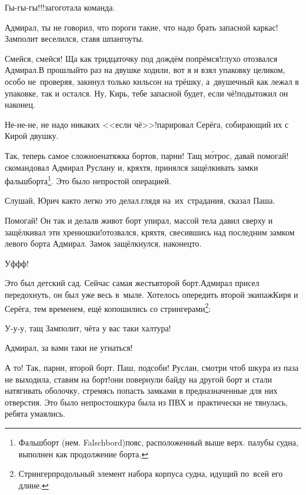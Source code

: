 \diagdash Гы-гы-гы!!!\mdash загоготала команда.

\diagdash Адмирал, ты не говорил, что пороги такие, что надо брать запасной каркас!\mdash Замполит веселился, ставя шпангоуты.

\diagdash Смейся, смейся! Ща как тридцаточку под дождём попрёмся!\mdash глухо отозвался Адмирал.\mdash В прошлый\sdash то раз на двушке ходили, вот я и взял упаковку целиком, особо не~проверяя, закинул только кильсон на трёшку, а~двушечный как лежал в упаковке, так и остался. Ну, Кирь, тебе запасной будет, если чё!\mdash подытожил он наконец.

\diagdash Не-не-не, не надо никаких <<если чё>>!\mdash парировал Серёга, собирающий их с Кирой двушку.

\diagdash Так, теперь самое сложное\mdash натяжка бортов, парни! Тащ м\'{о}трос, давай помогай!\mdash скомандовал Адмирал Руслану и, кряхтя, принялся защёлкивать замки фальшборта\footnote{Фальшборт (нем. Falschbord)\mdash пояс, расположенный выше верх. палубы судна, выполнен как продолжение борта\cite{МорскойСправочник}.}. Это было непростой операцией.

\diagdash Слушай, Юрич как\sdash то легко это делал.\mdash глядя на~их~страдания, сказал Паша.

\diagdash Помогай! Он так и делал\mdash в живот борт упирал, массой тела давил сверху и защёлкивал эти хренюшки!\mdash отозвался, кряхтя, свесившись над последним замком левого борта Адмирал. Замок защёлкнулся, наконец\sdash то.

\diagdash Уф\sdash ф\sdash ф!

\renewcommand*{\thefootnote}{\fnsymbol{footnote}}
\setcounter{footnote}{0}
\diagdash Это был детский сад. Сейчас самая жесть\mdash второй борт.\mdash Адмирал присел передохнуть, он был уже весь в~мыле. Хотелось опередить второй экипаж\mdash Киря и Серёга, тем временем, ещё копошились со стрингерами\footnote{Стрингер\mdash продольный элемент набора корпуса судна, идущий по~всей его длине\cite{МорскойСправочник}.}: 

\diagdash У-у-у, тащ Замполит, чёта у вас таки халтура!

\diagdash Адмирал, за вами таки не угнаться!

\diagdash А то! Так, парни, второй борт. Паш, подсоби! Руслан, смотри чтоб шкура из паза не выходила, ставим на борт!\mdash они повернули байду на другой борт и стали натягивать оболочку, стремясь попасть замками в предназначенные для них отверстия. Это было непросто\mdash шкура была из ПВХ и~практически не тянулась, ребята умаялись.

